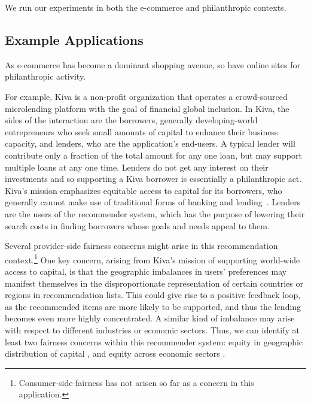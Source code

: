 
We run our experiments in both the e-commerce and philanthropic contexts.
\subsection{Example Applications}


As e-commerce has become a dominant shopping avenue, so have online sites for philanthropic activity. 

For example, Kiva is a non-profit organization that operates a crowd-sourced microlending platform with the goal of financial global inclusion. In Kiva, the sides of the interaction are the borrowers, generally developing-world entrepreneurs who seek small amounts of capital to enhance their business capacity, and lenders, who are the application's end-users. A typical lender will contribute only a fraction of the total amount for any one loan, but may support multiple loans at any one time. Lenders do not get any interest on their investments and so supporting a Kiva borrower is essentially a philanthropic act. Kiva's mission emphasizes equitable access to capital for its borrowers, who generally cannot make use of traditional forms of banking and lending~\cite{Choo_understanding_kiva}. Lenders are the users of the recommender system, which has the purpose of lowering their search costs in finding borrowers whose goals and needs appeal to them. 

Several provider-side fairness concerns might arise in this recommendation context.\footnote{Consumer-side fairness has not arisen so far as a concern in this application.} One key concern, arising from Kiva's mission of supporting world-wide access to capital, is that the geographic imbalances in users' preferences may manifest themselves in the disproportionate representation of certain countries or regions in recommendation lists. This could give rise to a positive feedback loop, as the recommended items are more likely to be supported, and thus the lending becomes even more highly concentrated. A similar kind of imbalance may arise with respect to different industries or economic sectors. Thus, we can identify at least two fairness concerns within this recommender system: equity in geographic distribution of capital \cite{liu2019personalized}, and equity across economic sectors
\cite{sonboli2020opportunistic}.


